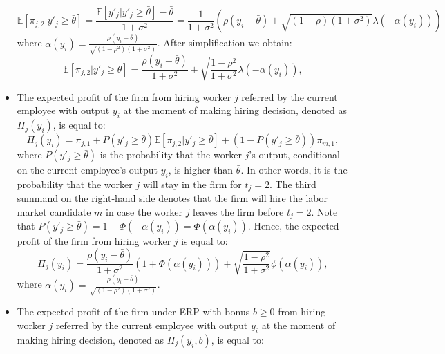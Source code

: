 \documentclass[12pt]{article}
\begin{document}
\begin{itemize}
    \begin{equation*}
        \mathbb{E}[\pi_{j,2}| y'_j \geq \bar{\theta}]
        = \frac{\mathbb{E}[y'_j| y'_j \geq \bar{\theta}]-\bar{\theta}}{1+\sigma^2}
        = \frac{1}{1+\sigma^2}\left( \rho(y_i - \bar{\theta}) + \sqrt{(1-\rho)(1+\sigma^2)} \lambda(-\alpha(y_i)) \right)
    \end{equation*}
    where $\alpha(y_i) = \frac{\rho\left(y_i - \bar{\theta}\right)}{\sqrt{(1-\rho^2)(1+\sigma^2)}}$. After simplification we obtain:
    \begin{equation}\label{eq:profit_j_exp_y_i}
        \mathbb{E}[\pi_{j,2}| y'_j \geq \bar{\theta}] = \frac{\rho(y_i - \bar{\theta})}{1+\sigma^2} + \sqrt{\frac{1-\rho^2}{1+\sigma^2}}\lambda(-\alpha(y_i)),
    \end{equation}
    \item The expected profit of the firm from hiring worker $j$ referred by the current employee with output $y_i$ at the moment of making hiring decision, denoted as $\Pi_j(y_i)$, is equal to:
    \begin{equation*}
        \Pi_j(y_i) = \pi_{j,1} + P\left( y'_j \geq \bar{\theta} \right) \mathbb {E}[\pi_{j,2} | y'_j \geq \bar{\theta}] 
        + (1 - P\left( y'_j \geq \bar{\theta} \right)) \pi_{m,1},
    \end{equation*}
    where $P\left( y'_j \geq \bar{\theta} \right)$ is the probability that the worker $j$'s output, conditional on the current employee's output $y_i$, is higher than $\bar{\theta}$. In other words, it is the probability that the worker $j$ will stay in the firm for $t_j = 2$. The third summand on the right-hand side denotes that the firm will hire the labor market candidate $m$ in case the worker $j$ leaves the firm before $t_j = 2$. Note that $P\left( y'_j \geq \bar{\theta} \right) = 1-\Phi(-\alpha(y_i)) = \Phi(\alpha(y_i))$. Hence, the expected profit of the firm from hiring worker $j$ is equal to:
    \begin{equation}\label{eq_pi_j_y_i}
        \Pi_j(y_i) = \frac{\rho\left(y_i-\bar{\theta}\right)}{1+\sigma^2}\left(1+\Phi\left(\alpha(y_i)\right)\right)
        + \sqrt{\frac{1-\rho^2}{1+\sigma^2}}\phi\left(\alpha(y_i)\right),
    \end{equation}
    where $\alpha(y_i) = \frac{\rho\left(y_i - \bar{\theta}\right)}{\sqrt{(1-\rho^2)(1+\sigma^2)}}$.
    \item The expected profit of the firm under ERP with bonus $b \geq 0$ from hiring worker $j$ referred by the current employee with output $y_i$ at the moment of making hiring decision, denoted as $\Pi_j(y_i, b)$, is equal to:

\end{itemize}
\end{document}
